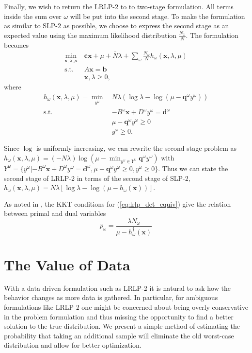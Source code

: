 \documentclass[11pt]{article}
\newcommand{\x}{\mathbf{x}}
\renewcommand{\c}{\mathbf{c}}
\newcommand{\q}{\mathbf{q}}
\renewcommand{\b}{\mathbf{b}}
\renewcommand{\d}{\mathbf{d}}
\newcommand{\st}{\mbox{s.t.}}
\begin{document}
Finally, we wish to return the LRLP-2 to to two-stage formulation.  All terms inside the sum over $\omega$ will be put into the second stage.  To make the formulation as similar to SLP-2 as possible, we choose to express the second stage as an expected value using the maximum likelihood distribution $\frac{N_\omega}{N}$.  The formulation becomes
\begin{align}
	\min_{\x,\lambda,\mu} \ & \c\x + \mu + \bar{N}\lambda + \sum_\omega \frac{N_\omega}{N} h_\omega(\x,\lambda,\mu) \nonumber \\
	\st \ & A\x = \b \label{eq:lrlp_two_stage} \\
	& \x,\lambda \geq 0, \nonumber
\end{align}
where
\begin{align}
	h_\omega(\x,\lambda,\mu) = \min_{y^\omega} \ & N\lambda (\log\lambda - \log(\mu - \q^\omega y^\omega)) \label{eq:lrlp_second_stage} \\
	\st \ & -B^\omega \x + D^\omega y^\omega = \d^\omega \nonumber \\
	& \mu - \q^\omega y^\omega \geq 0 \label{eq:lrlp_feas_constraint} \\
	& y^\omega \geq 0. \nonumber
\end{align}


Since $\log$ is uniformly increasing, we can rewrite the second stage problem as $h_\omega(\x,\lambda,\mu) = (-N\lambda) \log(\mu - \min_{y^\omega \in Y^\omega} \q^\omega y^\omega )$ with $Y^\omega = \{y^\omega | -B^\omega \x + D^\omega y^\omega = \d^\omega, \mu - \q^\omega y^\omega \geq 0, y^\omega \geq 0\}$.  Thus we can state the second stage of LRLP-2 in terms of the second stage of SLP-2, $h_\omega(\x,\lambda,\mu) = N\lambda\left[\log\lambda - \log(\mu - h_\omega(\x))\right]$.

As noted in \cite{wang2010likelihood}, the KKT conditions for (\ref{eq:lrlp_det_equiv}) give the relation between primal and dual variables
\begin{equation}
	p_\omega = \frac{\lambda N_\omega}{\mu - h^\dagger_\omega(\x)} \label{eq:kkt}
\end{equation}


\section{The Value of Data} \label{sec:value}

With a data driven formulation such as LRLP-2 it is natural to ask how the behavior changes as more data is gathered.  In particular, for ambiguous formulations like LRLP-2 one might be concerned about being overly conservative in the problem formulation and thus missing the opportunity to find a better solution to the true distribution.  We present a simple method of estimating the probability that taking an additional sample will eliminate the old worst-case distribution and allow for better optimization.
\end{document}
